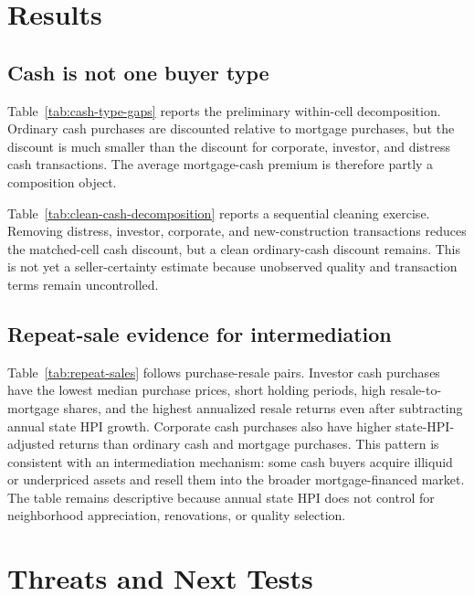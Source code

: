 \documentclass[12pt, letterpaper]{article}
\begin{document}
\section{Results}\label{sec:results}

\subsection{Cash is not one buyer type}

Table~\ref{tab:cash-type-gaps} reports the preliminary within-cell decomposition. Ordinary cash purchases are discounted relative to mortgage purchases, but the discount is much smaller than the discount for corporate, investor, and distress cash transactions. The average mortgage-cash premium is therefore partly a composition object.



Table~\ref{tab:clean-cash-decomposition} reports a sequential cleaning exercise. Removing distress, investor, corporate, and new-construction transactions reduces the matched-cell cash discount, but a clean ordinary-cash discount remains. This is not yet a seller-certainty estimate because unobserved quality and transaction terms remain uncontrolled.



\subsection{Repeat-sale evidence for intermediation}

Table~\ref{tab:repeat-sales} follows purchase-resale pairs. Investor cash purchases have the lowest median purchase prices, short holding periods, high resale-to-mortgage shares, and the highest annualized resale returns even after subtracting annual state HPI growth. Corporate cash purchases also have higher state-HPI-adjusted returns than ordinary cash and mortgage purchases. This pattern is consistent with an intermediation mechanism: some cash buyers acquire illiquid or underpriced assets and resell them into the broader mortgage-financed market. The table remains descriptive because annual state HPI does not control for neighborhood appreciation, renovations, or quality selection.



\section{Threats and Next Tests}\label{sec:threats}
\end{document}
